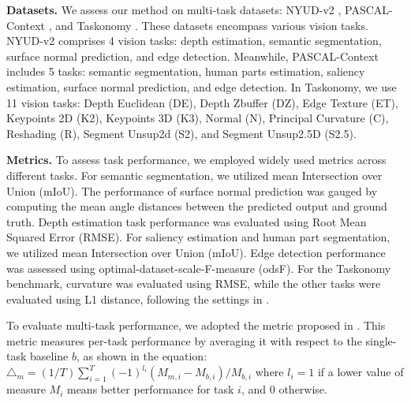 \textbf{Datasets.} We assess our method on multi-task datasets: NYUD-v2 \cite{RN15}, PASCAL-Context \cite{mottaghi2014role}, and Taskonomy \cite{zamir2018taskonomy}. These datasets encompass various vision tasks. NYUD-v2 comprises 4 vision tasks: depth estimation, semantic segmentation, surface normal prediction, and edge detection. Meanwhile, PASCAL-Context includes 5 tasks: semantic segmentation, human parts estimation, saliency estimation, surface normal prediction, and edge detection. In Taskonomy, we use 11 vision tasks: Depth Euclidean (DE), Depth Zbuffer (DZ), Edge Texture (ET),  Keypoints 2D (K2), Keypoints 3D (K3), Normal (N), Principal Curvature (C), Reshading (R), Segment Unsup2d (S2), and Segment Unsup2.5D (S2.5).

\textbf{Metrics. } To assess task performance, we employed widely used metrics across different tasks. For semantic segmentation, we utilized mean Intersection over Union (mIoU). The performance of surface normal prediction was gauged by computing the mean angle distances between the predicted output and ground truth. Depth estimation task performance was evaluated using Root Mean Squared Error (RMSE). For saliency estimation and human part segmentation, we utilized mean Intersection over Union (mIoU). Edge detection performance was assessed using optimal-dataset-scale-F-measure (odsF). For the Taskonomy benchmark, curvature was evaluated using RMSE, while the other tasks were evaluated using L1 distance, following the settings in \cite{chen2023mod}. 

To evaluate multi-task performance, we adopted the metric proposed in \cite{RN2}. This metric measures per-task performance by averaging it with respect to the single-task baseline $b$, as shown in the equation: $\triangle_m = (1/T)\sum_{i=1}^{T}(-1)^{l_i}(M_{m,i}-M_{b,i})/M_{b,i}$ where $l_i=1$ if a lower value of measure $M_i$ means better performance for task $i$, and 0 otherwise.


